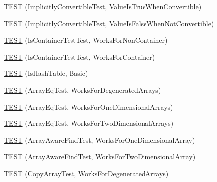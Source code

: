 \begin{DoxyCompactItemize}
\item 
\mbox{\hyperlink{_obj__test_2lib_2googletest-release-1_88_81_2googletest_2test_2gtest__unittest_8cc_aa483d18c01dd363d5505a2e24c0b0b7c}{T\+E\+ST}} (Implicitly\+Convertible\+Test, Value\+Is\+True\+When\+Convertible)
\item 
\mbox{\hyperlink{_obj__test_2lib_2googletest-release-1_88_81_2googletest_2test_2gtest__unittest_8cc_ad3e668a77fee960f37fd5234a0e990f4}{T\+E\+ST}} (Implicitly\+Convertible\+Test, Value\+Is\+False\+When\+Not\+Convertible)
\item 
\mbox{\hyperlink{_obj__test_2lib_2googletest-release-1_88_81_2googletest_2test_2gtest__unittest_8cc_a819ddb03c072631f5606a9ddf4be5ef9}{T\+E\+ST}} (Is\+Container\+Test\+Test, Works\+For\+Non\+Container)
\item 
\mbox{\hyperlink{_obj__test_2lib_2googletest-release-1_88_81_2googletest_2test_2gtest__unittest_8cc_a28c741995150722b00c039ead2b8ab04}{T\+E\+ST}} (Is\+Container\+Test\+Test, Works\+For\+Container)
\item 
\mbox{\hyperlink{_obj__test_2lib_2googletest-release-1_88_81_2googletest_2test_2gtest__unittest_8cc_ab060da75dc9cd1d8ece17e4c1ed3c037}{T\+E\+ST}} (Is\+Hash\+Table, Basic)
\item 
\mbox{\hyperlink{_obj__test_2lib_2googletest-release-1_88_81_2googletest_2test_2gtest__unittest_8cc_ae9e7a844847a2df933aa4c2f85f7ceed}{T\+E\+ST}} (Array\+Eq\+Test, Works\+For\+Degenerated\+Arrays)
\item 
\mbox{\hyperlink{_obj__test_2lib_2googletest-release-1_88_81_2googletest_2test_2gtest__unittest_8cc_a4ea595c1e4b3620fb8cf7366dd533c95}{T\+E\+ST}} (Array\+Eq\+Test, Works\+For\+One\+Dimensional\+Arrays)
\item 
\mbox{\hyperlink{_obj__test_2lib_2googletest-release-1_88_81_2googletest_2test_2gtest__unittest_8cc_ab18237f1a37018db8b5a78ae84b209ec}{T\+E\+ST}} (Array\+Eq\+Test, Works\+For\+Two\+Dimensional\+Arrays)
\item 
\mbox{\hyperlink{_obj__test_2lib_2googletest-release-1_88_81_2googletest_2test_2gtest__unittest_8cc_a563807f4b8c6d7fbf2945f279e38468e}{T\+E\+ST}} (Array\+Aware\+Find\+Test, Works\+For\+One\+Dimensional\+Array)
\item 
\mbox{\hyperlink{_obj__test_2lib_2googletest-release-1_88_81_2googletest_2test_2gtest__unittest_8cc_a1ca0fb8b6355671bbe5a62300585db5a}{T\+E\+ST}} (Array\+Aware\+Find\+Test, Works\+For\+Two\+Dimensional\+Array)
\item 
\mbox{\hyperlink{_obj__test_2lib_2googletest-release-1_88_81_2googletest_2test_2gtest__unittest_8cc_ad6d3761861147173657e547cb118877f}{T\+E\+ST}} (Copy\+Array\+Test, Works\+For\+Degenerated\+Arrays)

\end{DoxyCompactItemize}
